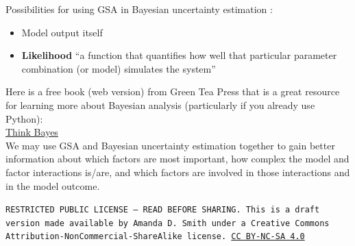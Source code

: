 \documentclass[10pt]{article}
\begin{document}
\medskip

\noindent{}
Possibilities for using GSA in Bayesian uncertainty estimation \cite{Saltelli2004-ga}:

\begin{itemize}
\item Model output itself
\item \textbf{Likelihood} \hspace{0.25cm} ``a function that quantifies how well that
particular parameter combination (or model) simulates the system'' \cite{Blasone2008-av}
\end{itemize}

\noindent
Here is a free book (web version) from Green Tea Press that is a great resource for learning more about Bayesian analysis (particularly if you already use Python):\\

\href{http://greenteapress.com/wp/think-bayes/}{Think Bayes} \cite{Downey2013-ma}\\


We may use GSA and Bayesian uncertainty estimation together to gain better information about which factors are most important, how complex the model and factor interactions is/are, and which factors are involved in those interactions and in the model outcome.

\bigskip

\noindent
\texttt{\footnotesize RESTRICTED PUBLIC LICENSE --- READ BEFORE SHARING. This is a draft version made available by Amanda D. Smith under a Creative Commons Attribution-NonCommercial-ShareAlike license. 
\href{https://creativecommons.org/licenses/by-nc-sa/4.0/}{CC BY-NC-SA 4.0}}


\printbibliography
\end{document}
